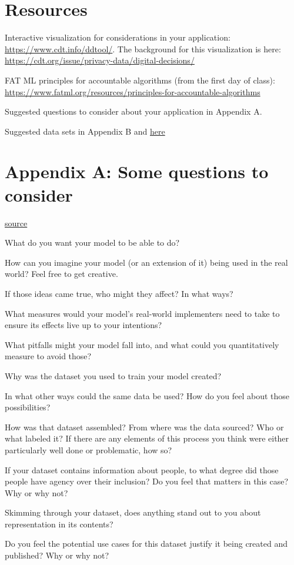 \documentclass{tufte-handout}
\begin{document}
\section*{Resources}
\bi
\item Interactive visualization for considerations in your application: \href{https://www.cdt.info/ddtool/}{https://www.cdt.info/ddtool/}. The background for this visualization is here: \href{https://cdt.org/issue/privacy-data/digital-decisions/} {https://cdt.org/issue/privacy-data/digital-decisions/} 
\item FAT ML principles for accountable algorithms (from the first day of class): \href{https://www.fatml.org/resources/principles-for-accountable-algorithms}{https://www.fatml.org/resources/principles-for-accountable-algorithms}
\item Suggested questions to consider about your application in Appendix A.
\item Suggested data sets in Appendix B and \href{https://www.notion.so/Entry-Level-Computer-Vision-Datasets-cc6fb53f51324779b29e26337642a649}{here}
\ei


\section*{Appendix A: Some questions to consider}
\href{https://www.notion.so/ANN-Project-Framing-76e1b6af347f475a983487996ac9760d}{source}
\bi
\item What do you want your model to be able to do?
\item How can you imagine your model (or an extension of it) being used in the real world? Feel free to get creative.
\item If those ideas came true, who might they affect? In what ways?
\item What measures would your model's real-world implementers need to take to ensure its effects live up to your intentions?
\item What pitfalls might your model fall into, and what could you quantitatively measure to avoid those?
\item Why was the dataset you used to train your model created?
\item In what other ways could the same data be used? How do you feel about those possibilities?
\item How was that dataset assembled? From where was the data sourced? Who or what labeled it? If there are any elements of this process you think were either particularly well done or problematic, how so?
\item If your dataset contains information about people, to what degree did those people have agency over their inclusion? Do you feel that matters in this case? Why or why not?
\item Skimming through your dataset, does anything stand out to you about representation in its contents?
\item Do you feel the potential use cases for this dataset justify it being created and published? Why or why not?
\ei
\end{document}
